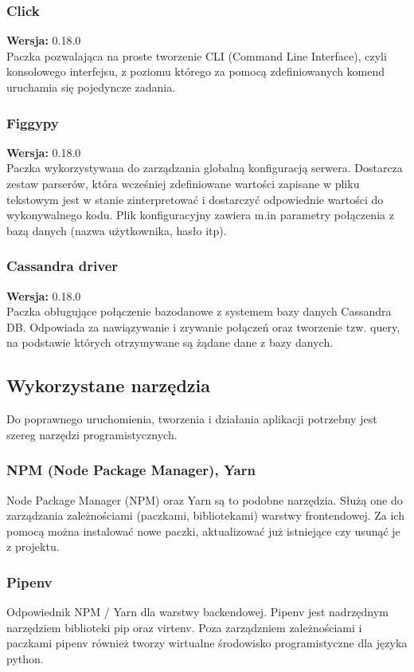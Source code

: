 \documentclass[eng,printmode]{mgr}
\begin{document}
\subsubsection{Click}
\small \textbf{Wersja:} 0.18.0\\
Paczka pozwalająca na proste tworzenie CLI (Command Line Interface), czyli konsolowego interfejsu, z poziomu którego za pomocą zdefiniowanych komend uruchamia się pojedyncze zadania.
\subsubsection{Figgypy}
\small \textbf{Wersja:} 0.18.0\\
Paczka wykorzystywana do zarządzania globalną konfiguracją serwera. Dostarcza zestaw parserów, która wcześniej zdefiniowane wartości zapisane w pliku tekstowym jest w stanie zinterpretować i dostarczyć odpowiednie wartości do wykonywalnego kodu. Plik konfiguracyjny zawiera m.in parametry połączenia z bazą danych (nazwa użytkownika, hasło itp).
\subsubsection{Cassandra driver}
\small \textbf{Wersja:} 0.18.0\\
Paczka obługujące połączenie bazodanowe z systemem bazy danych Cassandra DB. Odpowiada za nawiązywanie i zrywanie połączeń oraz tworzenie tzw. query, na podstawie których otrzymywane są żądane dane z bazy danych.
\subsection{Wykorzystane narzędzia}
Do poprawnego uruchomienia, tworzenia i działania aplikacji potrzebny jest szereg narzędzi programistycznych.
\subsubsection{NPM (Node Package Manager), Yarn}
Node Package Manager (NPM) oraz Yarn są to podobne narzędzia. Służą one do zarządzania zależnościami (paczkami, bibliotekami) warstwy frontendowej. Za ich pomocą można instalować nowe paczki, aktualizować już istniejące czy usunąć je z projektu.
\subsubsection{Pipenv}
Odpowiednik NPM / Yarn dla warstwy backendowej. Pipenv jest nadrzędnym narzędziem biblioteki pip oraz virtenv. Poza zarządzniem zależnościami i paczkami pipenv również tworzy wirtualne środowisko programistyczne dla języka python.
\end{document}
